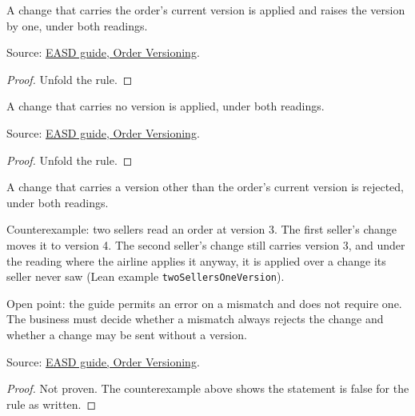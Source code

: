 \begin{theorem}
  \label{thm:order-creation-current-version-applied}
  A change that carries the order's current version is applied and raises
  the version by one, under both readings.

  Source: \href{https://standards.atlassian.net/wiki/spaces/EASD/pages/574259659/Order+Versioning}{EASD guide, Order Versioning}.
\end{theorem}
\begin{proof}
  Unfold the rule.
\end{proof}

\begin{theorem}
  \label{thm:order-creation-no-version-applied}
  A change that carries no version is applied, under both readings.

  Source: \href{https://standards.atlassian.net/wiki/spaces/EASD/pages/574259659/Order+Versioning}{EASD guide, Order Versioning}.
\end{theorem}
\begin{proof}
  Unfold the rule.
\end{proof}

\begin{theorem}
  \label{thm:order-creation-stale-rejected}
  A change that carries a version other than the order's current version is
  rejected, under both readings.

  Counterexample: two sellers read an order at version 3.  The first
  seller's change moves it to version 4.  The second seller's change still
  carries version 3, and under the reading where the airline applies it
  anyway, it is applied over a change its seller never saw (Lean example
  \texttt{twoSellersOneVersion}).

  Open point: the guide permits an error on a mismatch and does not require
  one.  The business must decide whether a mismatch always rejects the change
  and whether a change may be sent without a version.

  Source: \href{https://standards.atlassian.net/wiki/spaces/EASD/pages/574259659/Order+Versioning}{EASD guide, Order Versioning}.
\end{theorem}
\begin{proof}
  Not proven.  The counterexample above shows the statement is false for the
  rule as written.
\end{proof}

